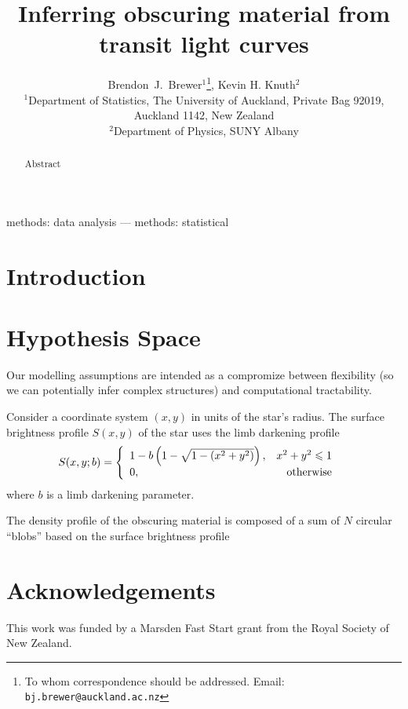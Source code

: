 \documentclass[useAMS,usenatbib]{mn2e}
\title[]
{Inferring obscuring material from transit light curves}
\author[Brewer and Knuth]{%
  Brendon~J.~Brewer$^{1}$\thanks{To whom correspondence should be addressed. Email: {\tt bj.brewer@auckland.ac.nz}},
  Kevin H. Knuth$^2$
  \medskip\\
  $^1$Department of Statistics, The University of Auckland, Private Bag 92019, Auckland 1142, New Zealand\\
  $^2$Department of Physics, SUNY Albany}
\begin{document}
             
\date{}
             
\maketitle

\label{firstpage}

\begin{abstract}
Abstract
\end{abstract}


\begin{keywords}
methods: data analysis --- methods: statistical
\end{keywords}

\section{Introduction}


\section{Hypothesis Space}
Our modelling assumptions are intended as a compromize between flexibility
(so we can potentially infer complex structures) and computational
tractability.

Consider a coordinate system $(x,y)$ in units of the star's radius.
The surface brightness profile
$S(x, y)$ of the star uses the limb darkening profile
\begin{align}
S(x, y; b) &=
    \left\{
        \begin{array}{lr}
            1 - b\left(1 - \sqrt{1 - (x^2 + y^2)}\right),   & x^2+y^2 \leq 1\\
            0, & \textnormal{otherwise}
        \end{array}
    \right.
\end{align}
where $b$ is a limb darkening parameter.

The density profile of the obscuring material is composed of a sum of
$N$ circular ``blobs'' based on the surface brightness profile


\section*{Acknowledgements}
This work was funded by a Marsden Fast Start grant from the Royal Society of
New Zealand.


\begin{thebibliography}{99}
\end{thebibliography}
\end{document}
